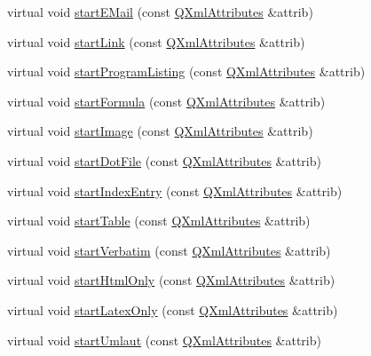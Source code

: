 \begin{DoxyCompactItemize}
\item 
virtual void \hyperlink{class_paragraph_handler_aef926a76ff1b15d0591c1691c69b5a14}{start\+E\+Mail} (const \hyperlink{class_q_xml_attributes}{Q\+Xml\+Attributes} \&attrib)
\item 
virtual void \hyperlink{class_paragraph_handler_adcda481db7de5dad9be7275f5500b878}{start\+Link} (const \hyperlink{class_q_xml_attributes}{Q\+Xml\+Attributes} \&attrib)
\item 
virtual void \hyperlink{class_paragraph_handler_aa791184d5d64430a5f1a5c0b1019e977}{start\+Program\+Listing} (const \hyperlink{class_q_xml_attributes}{Q\+Xml\+Attributes} \&attrib)
\item 
virtual void \hyperlink{class_paragraph_handler_acbd74ee40002dfc8c8a9ba67117e466a}{start\+Formula} (const \hyperlink{class_q_xml_attributes}{Q\+Xml\+Attributes} \&attrib)
\item 
virtual void \hyperlink{class_paragraph_handler_a34fad9a6a54b0aabc57944e543f57adb}{start\+Image} (const \hyperlink{class_q_xml_attributes}{Q\+Xml\+Attributes} \&attrib)
\item 
virtual void \hyperlink{class_paragraph_handler_a999f9f2ab75be864bd050f1e2254f7e9}{start\+Dot\+File} (const \hyperlink{class_q_xml_attributes}{Q\+Xml\+Attributes} \&attrib)
\item 
virtual void \hyperlink{class_paragraph_handler_a3abd7057608e28800ba398db752ae5a2}{start\+Index\+Entry} (const \hyperlink{class_q_xml_attributes}{Q\+Xml\+Attributes} \&attrib)
\item 
virtual void \hyperlink{class_paragraph_handler_a6f17044f6b4dfd6fa49333a77294043c}{start\+Table} (const \hyperlink{class_q_xml_attributes}{Q\+Xml\+Attributes} \&attrib)
\item 
virtual void \hyperlink{class_paragraph_handler_acbeb1e8ef8729b20a6c119bc38e607d6}{start\+Verbatim} (const \hyperlink{class_q_xml_attributes}{Q\+Xml\+Attributes} \&attrib)
\item 
virtual void \hyperlink{class_paragraph_handler_adf0a616699f57d2eaae639846a54ea09}{start\+Html\+Only} (const \hyperlink{class_q_xml_attributes}{Q\+Xml\+Attributes} \&attrib)
\item 
virtual void \hyperlink{class_paragraph_handler_a1e8de25137cb7f4cfbacc9b7136aca22}{start\+Latex\+Only} (const \hyperlink{class_q_xml_attributes}{Q\+Xml\+Attributes} \&attrib)
\item 
virtual void \hyperlink{class_paragraph_handler_ae2cf63d369d9ed14ff5e020c4a553c89}{start\+Umlaut} (const \hyperlink{class_q_xml_attributes}{Q\+Xml\+Attributes} \&attrib)

\end{DoxyCompactItemize}
